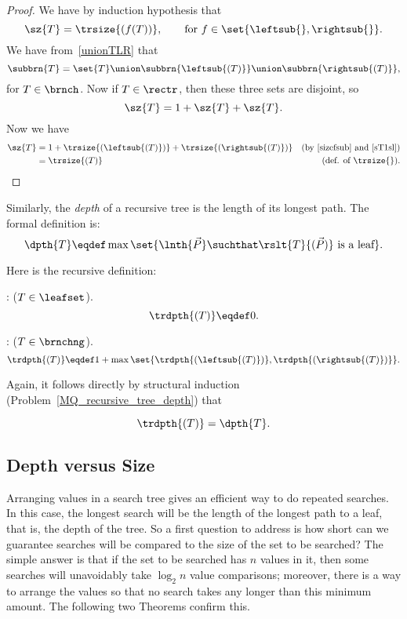 \begin{definition}
\begin{lemma}
\begin{proof}
We have by induction hypothesis that
\begin{equation}\label{sizefsub}
\sz{T} = \trsize{(f(T))}, \qquad \text{for}\ f \in
\set{\leftsub{}, \rightsub{}}.
\end{equation}
We have from~\ref{unionTLR} that
\[
\subbrn{T} = \set{T} \union \subbrn{\leftsub{(T)}} \union \subbrn{\rightsub{(T)}},
\]
for $T \in \brnch$.  Now if $T \in \rectr$, then these three sets are disjoint, so
\begin{equation}\label{sT1sl}
\sz{T} = 1 + \sz{T} + \sz{T}.
\end{equation}
Now we have
\begin{align*}
\sz{T}
 & = 1 + \trsize{(\leftsub{(T)})} + \trsize{(\rightsub{(T)})}
   & \text{(by~\eqref{sizefsub} and~\eqref{sT1sl})}\\
 & = \trsize{(T)} 
   & \text{(def. of \trsize{})}.
\end{align*}
\end{proof}
\end{lemma}

Similarly, the \emph{depth}  of a recursive tree is
the length of its longest path.  The formal definition is:
\begin{equation}\label{defdepth}
\dpth{T} \eqdef \max \set{\lnth{\vec{P}} \suchthat
  \rslt{T}{(\vec{P})}\ \text{is a leaf}}.
\end{equation}

Here is the recursive definition:
\begin{definition}
: ($T \in \leafset$).
\[
\trdpth{(T)} \eqdef 0.
\]

: ($T \in\brnchng$).
\[
\trdpth{(T)} \eqdef 1+\max\set{\trdpth{(\leftsub{(T)})}, \trdpth{(\rightsub{(T)})}}.
\]
\end{definition}

Again, it follows directly by structural induction
(Problem~\ref{MQ_recursive_tree_depth}) that
\begin{lemma}\label{lem:recdepth}
\begin{equation}\label{recdepth=depth}
\trdpth{(T)} = \dpth{T}.
\end{equation}
\end{lemma}

\subsection{Depth versus Size}

Arranging values in a search tree gives an efficient way to do
repeated searches.  In this case, the longest search will be the
length of the longest path to a leaf, that is, the depth of the tree.
So a first question to address is how short can we guarantee searches
will be compared to the size of the set to be searched?  The simple
answer is that if the set to be searched has $n$ values in it, then
some searches will unavoidably take $\log_2 n$ value comparisons;
moreover, there is a way to arrange the values so that no search takes
any longer than this minimum amount.  The following two Theorems
confirm this.


\end{definition}
